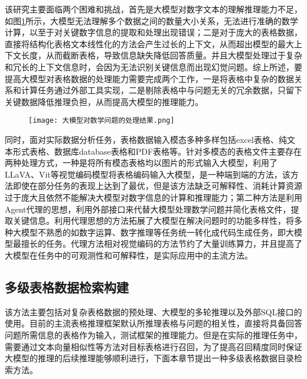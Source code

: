 该研究主要面临两个困难和挑战，首先是大模型对数字文本的理解推理能力不足，如图\ref{fig:4-1}所示，大模型无法理解多个数据之间的数量大小关系，无法进行准确的数学计算，以至于对关键数字信息的提取和处理出现错误；二是对于庞大的表格数据，直接将结构化表格文本线性化的方法会产生过长的上下文，从而超出模型的最大上下文长度，从而截断表格，导致信息缺失降低回答质量。并且大模型处理过于复杂和冗长的上下文信息时，会因为无法识别关键信息而出现幻觉问题。综上所述，要提高大模型对表格数据的处理能力需要完成两个工作，一是将表格中复杂的数据关系和计算任务通过外部工具实现，二是剔除表格中与问题无关的冗余数据，只留下关键数据降低推理负担，从而提高大模型的推理能力。
\begin{figure}[!htbp]
    \centering
    \texttt{[image: 大模型对数学问题的处理结果.png]}
    \label{fig:4-1}
\end{figure}
同时，面对实际数据分析任务，表格数据输入模态多种多样包括excel表格、纯文本形式表格、数据库database表格和PDF表格等。针对多模态的表格文件主要存在两种处理方式，一种是将所有模态表格均以图片的形式输入大模型\cite{zheng2024multimodal}，利用了LLaVA、Vit\cite{bang2023multitask,chen2023clip2scene,liu2023visual,radford2021learning,dosovitskiy2020image}等视觉编码模型将表格编码输入大模型，是一种端到端的方法，该方法即使在部分任务的表现上达到了最优，但是该方法缺乏可解释性、消耗计算资源过于庞大且依然不能解决大模型对数字信息的计算和推理能力；第二种方法是利用Agent代理的思想，利用外部接口来代替大模型处理数学问题并简化表格文件，提取关键信息。利用代理思想的方法拓展了大模型在解决问题时的功能多样性，将多种大模型不熟悉的如数字运算、数字推理等任务统一转化成代码生成任务，即大模型最擅长的任务。代理方法相对视觉编码的方法节约了大量训练算力，并且提高了大模型在任务中的可观测性和可解释性，是实际应用中的主流方法。
\subsection{多级表格数据检索构建}
该方法主要包括对复杂表格数据的预处理、大模型的多轮推理以及外部SQL接口的使用。目前的主流表格推理框架默认所推理表格与问题的相关性，直接将具备回答问题所需信息的表格作为输入，测试框架的推理能力。但是在实际的推理任务中，需要通过文本向量相似性等方法对目标表格进行召回，为了提高召回精度同时保证大模型的推理的后续推理能够顺利进行，下面本章节提出一种多级表格数据目录检索方法。

